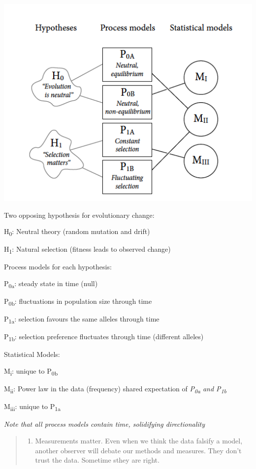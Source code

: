 \documentclass[
]{book}
\providecommand{\tightlist}{%
  \setlength{\itemsep}{0pt}\setlength{\parskip}{0pt}}
\theoremstyle{definition}
\theoremstyle{definition}
\theoremstyle{definition}
\theoremstyle{definition}
\theoremstyle{remark}
\begin{document}
\includegraphics[width=6.86in]{./_images/fig1.2}

Two opposing hypothesis for evolutionary change:

H\textsubscript{0}: Neutral theory (random mutation and drift)

H\textsubscript{1}: Natural selection (fitness leads to observed change)

Process models for each hypothesis:

P\textsubscript{0a}: steady state in time (null)

P\textsubscript{0b}: fluctuations in population size through time

P\textsubscript{1a}: selection favours the same alleles through time

P\textsubscript{1b}: selection preference fluctuates through time (different alleles)

Statistical Models:

M\textsubscript{i}: unique to P\textsubscript{0b}

M\textsubscript{ii}: Power law in the data (frequency) shared expectation of \emph{P\textsubscript{0a} and P\textsubscript{1b}}

M\textsubscript{iii}: unique to P\textsubscript{1a}

\emph{Note that all process models contain time, solidifying directionality}

\begin{quote}
\begin{enumerate}
\def\labelenumi{\arabic{enumi}.}
\setcounter{enumi}{1}
\tightlist
\item
  Measurements matter. Even when we think the data falsify a model, another observer will debate our methods and measures. They don't trust the data. Sometime sthey are right.
\end{enumerate}
\end{quote}
\end{document}
